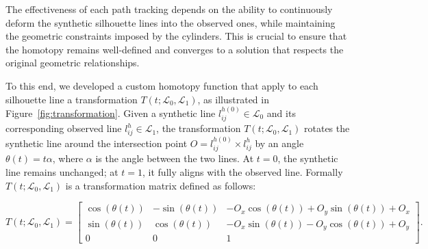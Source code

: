 The effectiveness of each path tracking depends on the ability to continuously deform the synthetic silhouette lines into the observed ones, while maintaining the geometric constraints imposed by the cylinders. This is crucial to ensure that the homotopy remains well-defined and converges to a solution that respects the original geometric relationships.

To this end, we developed a custom homotopy function that apply to each silhouette line a transformation $T(t; \mathcal{L}_0, \mathcal{L}_1)$, as illustrated in Figure~\ref{fig:transformation}. Given a synthetic line $l^{h(0)}_{ij} \in \mathcal{L}_0$ and its corresponding observed line $l^{h}_{ij} \in \mathcal{L}_1$, the transformation $T(t; \mathcal{L}_0, \mathcal{L}_1)$ rotates the synthetic line around the intersection point $O= l^{h(0)}_{ij} \times l^{h}_{ij}$ by an angle $\theta(t) = t\alpha$, where $\alpha$ is the angle between the two lines. At $t = 0$, the synthetic line remains unchanged; at $t = 1$, it fully aligns with the observed line. Formally $T(t; \mathcal{L}_0, \mathcal{L}_1)$ is a transformation matrix defined as follows:

\begin{equation}
T(t; \mathcal{L}_0, \mathcal{L}_1) =
    \begin{bmatrix}
    \cos(\theta(t)) & -\sin(\theta(t)) & -O_x \cos(\theta(t)) + O_y \sin(\theta(t)) + O_x \\
    \sin(\theta(t)) & \cos(\theta(t)) & -O_x \sin(\theta(t)) - O_y \cos(\theta(t)) + O_y \\
    0 & 0 & 1
    \end{bmatrix}.
\end{equation}

